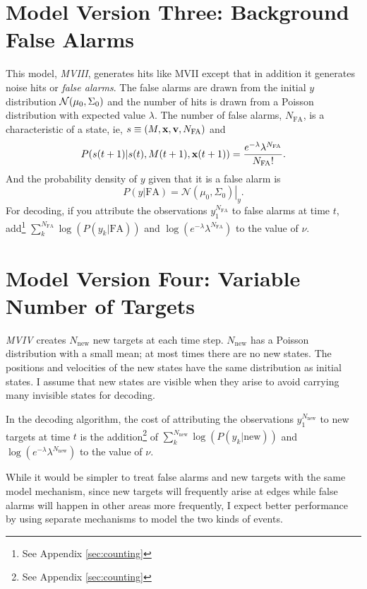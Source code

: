 \documentclass[12pt]{article}
\newcommand{\normal}[2]{{\cal N}(#1,#2)}
\newcommand{\NormalE}[3]{{\mathcal{N}}\left.\left(#1,#2\right)\right|_{#3}}
\newcommand{\ti}[2]{{#1}{(#2)}}                         %
\begin{document}
\section{Model Version Three: Background False Alarms}
\label{sec:model3}

This model, \emph{MVIII}, generates hits like MVII except that in
addition it generates noise hits or \emph{false alarms}.  The false
alarms are drawn from the initial $y$ distribution
$\normal{\mu_0}{\Sigma_0}$ and the number of hits is drawn from a
Poisson distribution with expected value $\lambda$.  The number of
false alarms, $N_{\text{FA}}$, is a characteristic of a state, ie, $s
\equiv (M,{\mathbf{x}},{\mathbf{v}},N_{\text{FA}})$ and
\begin{equation}
  \label{eq:2}
  P(\ti{s}{t+1}|\ti{s}{t},\ti{M}{t+1},\ti{\bx}{t+1}) =
  \frac{e^{-\lambda}\lambda^{N_{\text{FA}}}}{N_{\text{FA}}!}.
\end{equation}
And the probability density of $y$ given that it is a false alarm is
\begin{equation*}
  P(y|\text{FA}) = \NormalE{\mu_0}{\Sigma_0}{y}.
\end{equation*}
For decoding, if you attribute the observations $y_1^{N_{\text{FA}}}$
to false alarms at time $t$, add\footnote{See Appendix
  \ref{sec:counting}} $\sum_k^{N_{\text{FA}}} \log(P(y_k|\text{FA}))$
and $\log \left( e^{-\lambda} \lambda^{N_{\text{FA}}} \right)$ to the
value of $\nu$.


\section{Model Version Four: Variable Number of Targets}
\label{sec:model4}

\emph{MVIV} creates $N_{\text{new}}$ new targets at each time step.
$N_{\text{new}}$ has a Poisson distribution with a small mean; at most
times there are no new states.  The positions and velocities of the
new states have the same distribution as initial states.  I assume
that new states are visible when they arise to avoid carrying many
invisible states for decoding.

In the decoding algorithm, the cost of attributing the observations
$y_1^{N_{\text{new}}}$ to new targets at time $t$ is the
addition\footnote{See Appendix \ref{sec:counting}} of
$\sum_k^{N_{\text{new}}} \log(P(y_k|\text{new}))$ and $\log \left(
  e^{-\lambda} \lambda^{N_{\text{new}}}\right)$ to the value of
$\nu$.

While it would be simpler to treat false alarms and new targets with
the same model mechanism, since new targets will frequently arise at
edges while false alarms will happen in other areas more frequently, I
expect better performance by using separate mechanisms to model the
two kinds of events.
\end{document}
